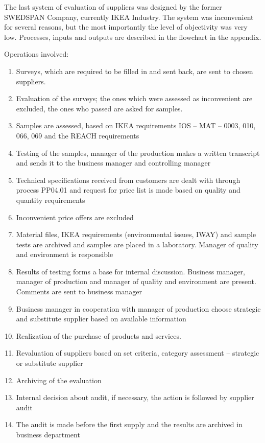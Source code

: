 \documentclass[oneside,12pt]{article}%
\begin{document}
The last system of evaluation of suppliers was designed by the former SWEDSPAN Company, currently IKEA Industry. The system was inconvenient for several reasons, but the most importantly the level of objectivity was very low. Processes, inputs and outputs are described in the flowchart in the appendix.

Operations involved:

\begin{enumerate}
  \item Surveys, which are required to be filled in and sent back, are sent to chosen suppliers.
  \item Evaluation of the surveys; the ones which were assessed as inconvenient are excluded, the ones who passed are asked for samples.
  \item Samples are assessed, based on IKEA requirements IOS – MAT – 0003, 010, 066, 069  and the REACH requirements
  \item Testing of the samples, manager of the production makes a written transcript and sends it to the business manager and controlling manager
  \item Technical specifications received from customers are dealt with through process PP04.01 and request for price list is made based on quality and quantity requirements
  \item   Inconvenient price offers are excluded
  \item Material files, IKEA requirements (environmental issues, IWAY) and sample tests are archived and samples are placed in a laboratory. Manager of quality and environment is responsible
  \item Results of testing forms a base for internal discussion. Business manager, manager of production and manager of quality and environment are present. Comments are sent to business manager
  \item Business manager in cooperation with manager of production choose strategic and substitute supplier based on available information
  \item Realization of the purchase of products and services.
  \item Revaluation of suppliers based on set criteria, category assessment – strategic or substitute supplier
  \item Archiving of the evaluation
  \item Internal decision about audit, if necessary, the action is followed by supplier audit
  \item The audit is made before the first supply and the results are archived in business department

\end{enumerate}
\end{document}
